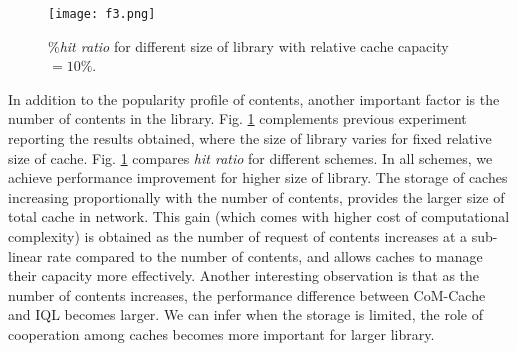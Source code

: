 \documentclass[journal,onecolumn]{IEEEtran}
\begin{document}
\begin{figure}[h]
\centering
\texttt{[image: f3.png]}
\caption{\%\textit{hit ratio} for different size of library with relative cache capacity $= 10\%$.}\label{cache:fig5}
\end{figure}






In addition to the popularity profile of contents, another important factor is the number of contents in the library. Fig. \ref{cache:fig5} complements previous experiment reporting the results obtained, where the size of library varies for fixed relative size of cache. Fig. \ref{cache:fig5} compares \textit{hit ratio} for different schemes. In all schemes, we achieve performance improvement for higher size of library. The storage of caches increasing proportionally with the number of contents, provides the larger size of total cache in network. This gain (which comes with higher cost of computational complexity) is obtained as the number of request of contents increases at a sub-linear rate compared to the number of contents, and allows caches to manage their capacity more effectively. Another interesting observation is that as the number of contents increases, the performance difference between CoM-Cache and IQL becomes larger. We can infer when the storage is limited, the role of cooperation among caches becomes more important for larger library.




\end{document}
